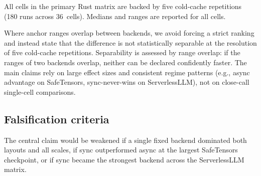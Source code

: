 All cells in the primary Rust matrix are backed by five cold-cache repetitions (180 runs across 36~cells). Medians and ranges are reported for all cells.

Where anchor ranges overlap between backends, we avoid forcing a strict ranking and instead state that the difference is not statistically separable at the resolution of five cold-cache repetitions. Separability is assessed by range overlap: if the ranges of two backends overlap, neither can be declared confidently faster. The main claims rely on large effect sizes and consistent regime patterns (e.g., async advantage on SafeTensors, sync-never-wins on ServerlessLLM), not on close-call single-cell comparisons.

\subsection{Falsification criteria}

The central claim would be weakened if a single fixed backend dominated both layouts and all scales, if sync outperformed async at the largest SafeTensors checkpoint, or if sync became the strongest backend across the ServerlessLLM matrix.
